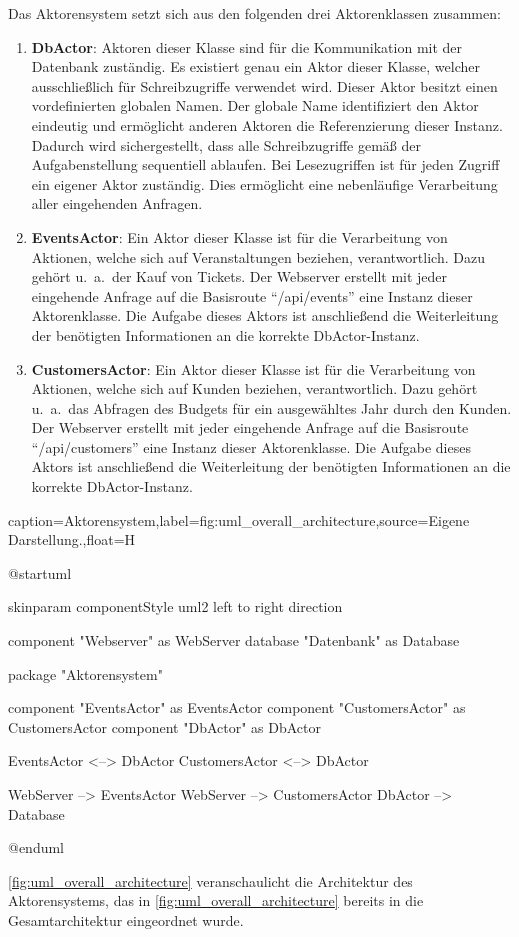 Das Aktorensystem setzt sich aus den folgenden drei Aktorenklassen zusammen:
\begin{enumerate}
    \item \textbf{DbActor}: Aktoren dieser Klasse sind für die Kommunikation mit der Datenbank zuständig.
    Es existiert genau ein Aktor dieser Klasse, welcher ausschließlich für Schreibzugriffe verwendet wird.
    Dieser Aktor besitzt einen vordefinierten globalen Namen.
    Der globale Name identifiziert den Aktor eindeutig und ermöglicht anderen Aktoren die Referenzierung dieser Instanz.
    Dadurch wird sichergestellt, dass alle Schreibzugriffe gemäß der Aufgabenstellung sequentiell ablaufen.
    Bei Lesezugriffen ist für jeden Zugriff ein eigener Aktor zuständig.
    Dies ermöglicht eine nebenläufige Verarbeitung aller eingehenden Anfragen.
    \item \textbf{EventsActor}: Ein Aktor dieser Klasse ist für die Verarbeitung von Aktionen, welche sich auf Veranstaltungen beziehen, verantwortlich.
    Dazu gehört u.\ a.\ der Kauf von Tickets.
    Der Webserver erstellt mit jeder eingehende Anfrage auf die Basisroute \enquote{/api/events} eine Instanz dieser Aktorenklasse. 
    Die Aufgabe dieses Aktors ist anschließend die Weiterleitung der benötigten Informationen an die korrekte DbActor-Instanz.
    \item \textbf{CustomersActor}: Ein Aktor dieser Klasse ist für die Verarbeitung von Aktionen, welche sich auf Kunden beziehen, verantwortlich.
    Dazu gehört u.\ a.\ das Abfragen des Budgets für ein ausgewähltes Jahr durch den Kunden.
    Der Webserver erstellt mit jeder eingehende Anfrage auf die Basisroute \enquote{/api/customers} eine Instanz dieser Aktorenklasse. 
    Die Aufgabe dieses Aktors ist anschließend die Weiterleitung der benötigten Informationen an die korrekte DbActor-Instanz.
\end{enumerate}

\begin{dhbwfigure}{caption=Aktorensystem,label=fig:uml_overall_architecture,source={Eigene Darstellung.},float=H}
    \begin{plantuml}
        @startuml

            skinparam componentStyle uml2
            left to right direction

            component "Webserver" as WebServer
            database "Datenbank" as Database

            package "Aktorensystem" {
                component "EventsActor" as EventsActor
                component "CustomersActor" as CustomersActor
                component "DbActor" as DbActor

                EventsActor <--> DbActor
                CustomersActor <--> DbActor
            }

            WebServer --> EventsActor
            WebServer --> CustomersActor
            DbActor --> Database

        @enduml
    \end{plantuml}
\end{dhbwfigure}\unskip

\autoref{fig:uml_overall_architecture} veranschaulicht die Architektur des Aktorensystems, das in \autoref{fig:uml_overall_architecture} bereits in die Gesamtarchitektur eingeordnet wurde.
